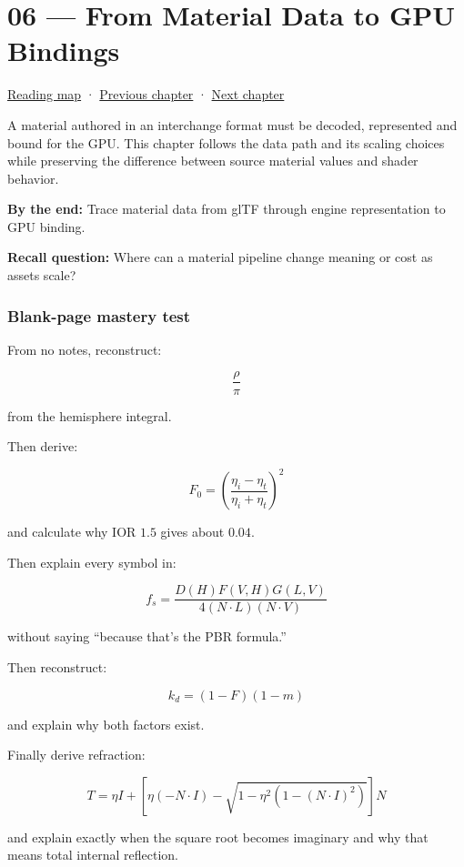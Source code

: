 \hypertarget{03-visual-computing-i-ch006}{}
\chapter{06 --- From Material Data to GPU Bindings}\label{03-visual-computing-i-ch006-from-material-data-to-gpu-bindings}

\hyperref[volume-reading-map]{Reading map} · \hyperref[03-visual-computing-i-ch005]{Previous chapter} · \hyperref[03-visual-computing-i-ch007]{Next chapter}

A material authored in an interchange format must be decoded, represented and bound for the GPU. This chapter follows the data path and its scaling choices while preserving the difference between source material values and shader behavior.

\textbf{By the end:} Trace material data from glTF through engine representation to GPU binding.

\textbf{Recall question:} Where can a material pipeline change meaning or cost as assets scale?

\subsection{Blank-page mastery test}\label{03-visual-computing-i-ch006-blank-page-mastery-test}

From no notes, reconstruct:

\[
\frac{\rho}{\pi}
\]

from the hemisphere integral.

Then derive:

\[
F_0=
\left(
\frac{\eta_i-\eta_t}
{\eta_i+\eta_t}
\right)^2
\]

and calculate why IOR \(1.5\) gives about \(0.04\).

Then explain every symbol in:

\[
\boxed{
f_s=
\frac{
D(H)F(V,H)G(L,V)
}{
4(N\cdot L)(N\cdot V)
}
}
\]

without saying ``because that's the PBR formula.''

Then reconstruct:

\[
k_d=(1-F)(1-m)
\]

and explain why both factors exist.

Finally derive refraction:

\[
T=
\eta I+
\left[
\eta(-N\cdot I)
-
\sqrt{
1-\eta^2
(1-(N\cdot I)^2)
}
\right]N
\]

and explain exactly when the square root becomes imaginary and why that means total internal reflection.

